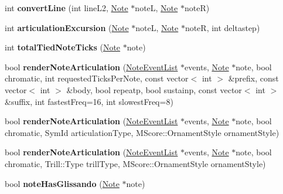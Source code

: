 \begin{DoxyCompactItemize}
\mbox{\label{namespace_ms_afbe881c63fa05a1d7453039b41a7b3c6}} 
int {\bfseries convert\+Line} (int line\+L2, \hyperlink{class_ms_1_1_note}{Note} $\ast$noteL, \hyperlink{class_ms_1_1_note}{Note} $\ast$noteR)
\item 
\mbox{\label{namespace_ms_ad5c1eeb4bf8db26d11b4c8f0c1be8b9c}} 
int {\bfseries articulation\+Excursion} (\hyperlink{class_ms_1_1_note}{Note} $\ast$noteL, \hyperlink{class_ms_1_1_note}{Note} $\ast$noteR, int deltastep)
\item 
\mbox{\label{namespace_ms_afa67a630748ae86ba70bc8d7cbecc75c}} 
int {\bfseries total\+Tied\+Note\+Ticks} (\hyperlink{class_ms_1_1_note}{Note} $\ast$note)
\item 
\mbox{\label{namespace_ms_a3559151bb979f9956f21eec27d40c3ad}} 
bool {\bfseries render\+Note\+Articulation} (\hyperlink{class_ms_1_1_note_event_list}{Note\+Event\+List} $\ast$events, \hyperlink{class_ms_1_1_note}{Note} $\ast$note, bool chromatic, int requested\+Ticks\+Per\+Note, const vector$<$ int $>$ \&prefix, const vector$<$ int $>$ \&body, bool repeatp, bool sustainp, const vector$<$ int $>$ \&suffix, int fastest\+Freq=16, int slowest\+Freq=8)
\item 
\mbox{\label{namespace_ms_ad0c9038099cf2b82abfabd920435001b}} 
bool {\bfseries render\+Note\+Articulation} (\hyperlink{class_ms_1_1_note_event_list}{Note\+Event\+List} $\ast$events, \hyperlink{class_ms_1_1_note}{Note} $\ast$note, bool chromatic, Sym\+Id articulation\+Type, M\+Score\+::\+Ornament\+Style ornament\+Style)
\item 
\mbox{\label{namespace_ms_ac81a5b60731d4cf41618f405fd7e191e}} 
bool {\bfseries render\+Note\+Articulation} (\hyperlink{class_ms_1_1_note_event_list}{Note\+Event\+List} $\ast$events, \hyperlink{class_ms_1_1_note}{Note} $\ast$note, bool chromatic, Trill\+::\+Type trill\+Type, M\+Score\+::\+Ornament\+Style ornament\+Style)
\item 
\mbox{\label{namespace_ms_ab849d53c2ed501ca3de9382f866f26bf}} 
bool {\bfseries note\+Has\+Glissando} (\hyperlink{class_ms_1_1_note}{Note} $\ast$note)
\item 
\mbox{\label{namespace_ms_af753b99882381a2e24edb14dba58a2b6}} 

\end{DoxyCompactItemize}
